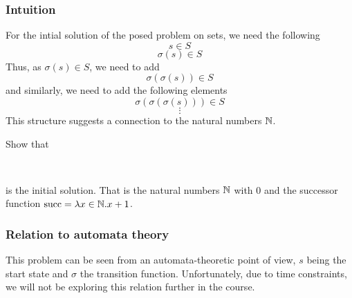 \subsubsection{Intuition}
For the intial solution of the posed problem on sets, we need the following
\[s \in S \]
\[\sigma(s) \in S \]
Thus, as $\sigma(s) \in S$, we need to add
\[\sigma(\sigma(s)) \in S\]
and similarly, we need to add the following elements
\[\sigma(\sigma(\sigma(s))) \in S\]
\[\vdots\]
This structure suggests a connection to the natural numbers $\mathbb{N}$.
\begin{exercise}
    Show that
    \begin{center}
         \\[3mm]
    \end{center}
    is the initial solution. That is the natural numbers $\mathbb{N}$ with 0 and
    the successor function $\textrm{succ} = \lambda x\in\mathbb{N}.x + 1$.
\end{exercise}


\subsubsection{Relation to automata theory}

This problem can be seen from an automata-theoretic point of view, $s$ being
the start state and $\sigma$ the transition function. Unfortunately, due to
time constraints, we will not be exploring this relation further in the
course.

